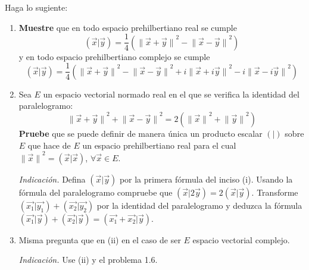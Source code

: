 \documentclass[12pt]{report}
\theoremstyle{largebreak}
\newcommand\pint[2]{\ensuremath{\left(#1\big|#2\right)}}
\newcommand\norm[1]{\ensuremath{\|#1\|}}
\begin{document}
    \begin{excer}
        Haga lo sugiente:
        \begin{enumerate}
            \item \textbf{Muestre} que en todo espacio prehilbertiano real se cumple
            \begin{equation*}
                \pint{\vec{x}}{\vec{y}}=\frac{1}{4}\left(\norm{\vec{x}+\vec{y}}^2-\norm{\vec{x}-\vec{y}}^2 \right)
            \end{equation*}
            y en todo espacio prehilbertiano complejo se cumple
            \begin{equation*}
                \pint{\vec{x}}{\vec{y}}=\frac{1}{4}\left(\norm{\vec{x}+\vec{y}}^2-\norm{\vec{x}-\vec{y}}^2+i\norm{\vec{x}+i\vec{y}}^2-i\norm{\vec{x}-i\vec{y}}^2 \right)
            \end{equation*}
            \item Sea $E$ un espacio vectorial normado real en el que se verifica la identidad del paralelogramo:
            \begin{equation*}
                \norm{\vec{x}+\vec{y}}^2+\norm{\vec{x}-\vec{y}}^2=2(\norm{\vec{x}}^2+\norm{\vec{y}}^2)
            \end{equation*}
            \textbf{Pruebe} que se puede definir de manera única un producto escalar $\pint{ }{ }$ sobre $E$ que hace de $E$ un espacio prehilbertiano real para el cual $\norm{\vec{x}}^2=\pint{\vec{x}}{\vec{x}}$, $\forall\vec{x}\in E$.

            \textit{Indicación.} Defina $\pint{\vec{x}}{\vec{y}}$ por la primera fórmula del inciso (i). Usando la fórmula del paralelogramo compruebe que $\pint{\vec{x}}{2\vec{y}}=2\pint{\vec{x}}{\vec{y}}$. Transforme $\pint{\vec{x_1}}{\vec{y_1}}+\pint{\vec{x_2}}{\vec{y_2}}$ por la identidad del paralelogramo y deduzca la fórmula $\pint{\vec{x_1}}{\vec{y}}+\pint{\vec{x_2}}{\vec{y}}=\pint{\vec{x_1}+\vec{x_2}}{\vec{y}}$.

            \item Misma pregunta que en (ii) en el caso de ser $E$ espacio vectorial complejo. 
            
            \textit{Indicación.} Use (ii) y el problema 1.6.
        \end{enumerate}
    \end{excer}
\end{document}
